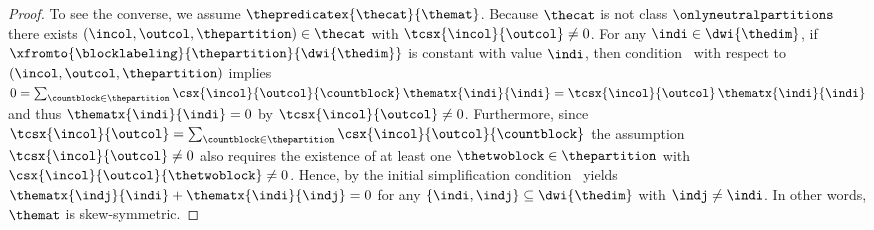 \documentclass[pdftex]{sigma}
\numberwithin{equation}{section}
\begin{document}
{\begin{proof}
  To see the converse, we assume $\thepredicatex{\thecat}{\themat}$. Because $\thecat$ is not class $\onlyneutralpartitions$ there exists $(\incol,\outcol,\thepartition)\in\thecat$ with $\tcsx{\incol}{\outcol}\neq 0$.
For any $\indi\in\dwi{\thedim}$, if $\xfromto{\blocklabeling}{\thepartition}{\dwi{\thedim}}$ is constant with value $\indi$, then con\-di\-tion~\conditionone{} with respect to $(\incol,\outcol,\thepartition)$ implies $0=\sum_{\countblock\in\thepartition}\csx{\incol}{\outcol}{\countblock}\,\thematx{\indi}{\indi}=\tcsx{\incol}{\outcol}\,\thematx{\indi}{\indi}$ and thus $\thematx{\indi}{\indi}=0$ by $\tcsx{\incol}{\outcol}\neq 0$. Furthermore,
since $\tcsx{\incol}{\outcol}=\sum_{\countblock\in\thepartition}\csx{\incol}{\outcol}{\countblock}$ the assumption $\tcsx{\incol}{\outcol}\neq 0$ also requires the existence of at least one $\thetwoblock\in\thepartition$ with $\csx{\incol}{\outcol}{\thetwoblock}\neq 0$. Hence, by the initial simplification  con\-di\-tion~\conditiontwo{}  yields  $\thematx{\indj}{\indi}+\thematx{\indi}{\indj}=0$ for any $\{\indi,\indj\}\subseteq\dwi{\thedim}$ with $\indj\neq \indi$. In other words, $\themat$ is skew-symmetric.
\end{proof}

}
\end{document}
